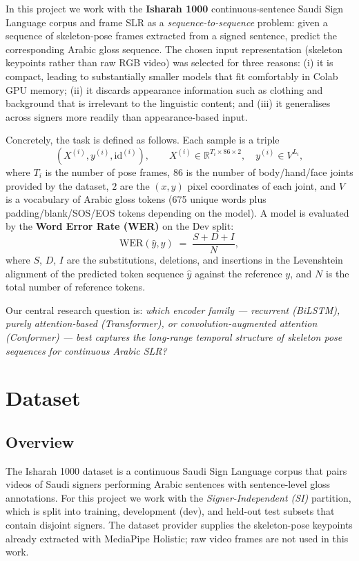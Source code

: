 \documentclass[11pt,a4paper]{article}
\begin{document}
In this project we work with the \textbf{Isharah 1000} continuous-sentence Saudi Sign Language corpus and frame SLR as a \emph{sequence-to-sequence} problem: given a sequence of skeleton-pose frames extracted from a signed sentence, predict the corresponding Arabic gloss sequence. The chosen input representation (skeleton keypoints rather than raw RGB video) was selected for three reasons: (i) it is compact, leading to substantially smaller models that fit comfortably in Colab GPU memory; (ii) it discards appearance information such as clothing and background that is irrelevant to the linguistic content; and (iii) it generalises across signers more readily than appearance-based input.

Concretely, the task is defined as follows. Each sample is a triple
\[
  (X^{(i)}, y^{(i)}, \mathrm{id}^{(i)}),\qquad
  X^{(i)} \in \mathbb{R}^{T_i \times 86 \times 2},\quad
  y^{(i)} \in V^{L_i},
\]
where $T_i$ is the number of pose frames, $86$ is the number of body/hand/face joints provided by the dataset, $2$ are the $(x,y)$ pixel coordinates of each joint, and $V$ is a vocabulary of Arabic gloss tokens (675 unique words plus padding/blank/SOS/EOS tokens depending on the model). A model is evaluated by the \textbf{Word Error Rate (WER)} on the Dev split:
\[
  \mathrm{WER}(\hat{y}, y) \;=\; \frac{S + D + I}{N},
\]
where $S$, $D$, $I$ are the substitutions, deletions, and insertions in the Levenshtein alignment of the predicted token sequence $\hat{y}$ against the reference $y$, and $N$ is the total number of reference tokens.

Our central research question is: \emph{which encoder family --- recurrent (BiLSTM), purely attention-based (Transformer), or convolution-augmented attention (Conformer) --- best captures the long-range temporal structure of skeleton pose sequences for continuous Arabic SLR?}

\section{Dataset}

\subsection{Overview}
The Isharah 1000 dataset \cite{isharah2024} is a continuous Saudi Sign Language corpus that pairs videos of Saudi signers performing Arabic sentences with sentence-level gloss annotations. For this project we work with the \emph{Signer-Independent (SI)} partition, which is split into training, development (dev), and held-out test subsets that contain disjoint signers. The dataset provider supplies the skeleton-pose keypoints already extracted with MediaPipe Holistic; raw video frames are not used in this work.
\end{document}
